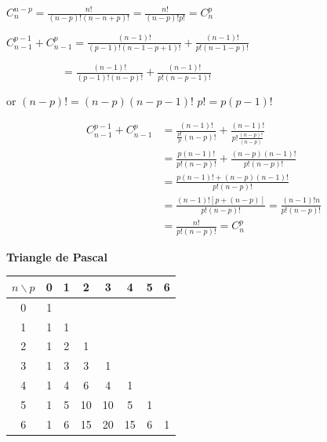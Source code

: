 \documentclass[12pt,a4paper]{article}
\begin{document}
\begin{enumerate}[label=\Roman*., font=\bfseries\color{red}]
\begin{enumerate}
\vspace{0.4cm}

$C_n^{n-p} = \frac{n!}{(n-p)!(n-n+p)!} = \frac{n!}{(n-p)! p!} = C_n^p$

\vspace{0.4cm}

$C_{n-1}^{p-1} + C_{n-1}^p = \frac{(n-1)!}{(p-1)!(n-1-p+1)!} + \frac{(n-1)!}{p!(n-1-p)!}$

\vspace{0.2cm}

$\quad \quad \quad \quad \quad = \frac{(n-1)!}{(p-1)!(n-p)!} + \frac{(n-1)!}{p!(n-p-1)!}$

\vspace{0.4cm}

or $(n-p)! = (n-p)(n-p-1)!$
$p! = p(p-1)!$

\[
\begin{aligned}
C_{n-1}^{p-1} + C_{n-1}^p &= \frac{(n-1)!}{\frac{p!}{p}(n-p)!} + \frac{(n-1)!}{p!\frac{(n-p)!}{(n-p)}} \\
&= \frac{p(n-1)!}{p!(n-p)!} + \frac{(n-p)(n-1)!}{p!(n-p)!} \\
&= \frac{p(n-1)! + (n-p)(n-1)!}{p!(n-p)!} \\
&= \frac{(n-1)![p + (n-p)]}{p!(n-p)!} = \frac{(n-1)!n}{p!(n-p)!} \\
&= \frac{n!}{p!(n-p)!} = C_n^p
\end{aligned}
\]

\textbf{Triangle de Pascal}

\begin{center}
\end{center}

\begin{center}
\begin{tabular}{|c|c|c|c|c|c|c|c|}
\hline
$n \backslash p$ & 0 & 1 & 2 & 3 & 4 & 5 & 6 \\ \hline
0 & 1 & & & & & & \\ \hline
1 & 1 & 1 & & & & & \\ \hline
2 & 1 & 2 & 1 & & & & \\ \hline
3 & 1 & 3 & 3 & 1 & & & \\ \hline
4 & 1 & 4 & 6 & 4 & 1 & & \\ \hline
5 & 1 & 5 & 10 & 10 & 5 & 1 & \\ \hline
6 & 1 & 6 & 15 & 20 & 15 & 6 & 1 \\ \hline
\end{tabular}
\end{center}


\end{enumerate}
\end{enumerate}
\end{document}
